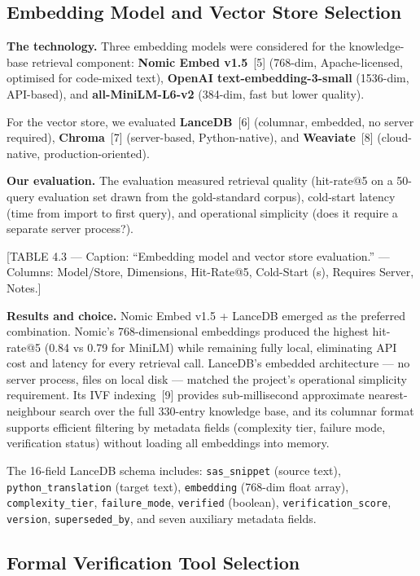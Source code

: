 \subsection{Embedding Model and Vector Store Selection}
\label{subsec:embedding-selection}

\textbf{The technology.} Three embedding models were considered for the
knowledge-base retrieval component: \textbf{Nomic Embed v1.5}~[5] (768-dim,
Apache-licensed, optimised for code-mixed text), \textbf{OpenAI
text-embedding-3-small} (1536-dim, API-based), and \textbf{all-MiniLM-L6-v2}
(384-dim, fast but lower quality).

For the vector store, we evaluated \textbf{LanceDB}~[6] (columnar, embedded,
no server required), \textbf{Chroma}~[7] (server-based, Python-native), and
\textbf{Weaviate}~[8] (cloud-native, production-oriented).

\textbf{Our evaluation.} The evaluation measured retrieval quality (hit-rate@5
on a 50-query evaluation set drawn from the gold-standard corpus), cold-start
latency (time from import to first query), and operational simplicity
(does it require a separate server process?).

[TABLE 4.3 --- Caption: ``Embedding model and vector store evaluation.'' ---
Columns: Model/Store, Dimensions, Hit-Rate@5, Cold-Start (s), Requires Server,
Notes.]

\textbf{Results and choice.} Nomic Embed v1.5 + LanceDB emerged as the
preferred combination. Nomic's 768-dimensional embeddings produced the highest
hit-rate@5 (0.84 vs 0.79 for MiniLM) while remaining fully local, eliminating
API cost and latency for every retrieval call. LanceDB's embedded architecture
--- no server process, files on local disk --- matched the project's
operational simplicity requirement. Its IVF indexing~[9] provides
sub-millisecond approximate nearest-neighbour search over the full 330-entry
knowledge base, and its columnar format supports efficient filtering by
metadata fields (complexity tier, failure mode, verification status) without
loading all embeddings into memory.

The 16-field LanceDB schema includes: \texttt{sas\_snippet} (source text),
\texttt{python\_translation} (target text), \texttt{embedding} (768-dim float
array), \texttt{complexity\_tier}, \texttt{failure\_mode}, \texttt{verified}
(boolean), \texttt{verification\_score}, \texttt{version}, \texttt{superseded\_by},
and seven auxiliary metadata fields.

\subsection{Formal Verification Tool Selection}
\label{subsec:z3-selection}

